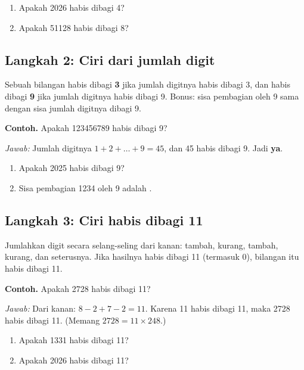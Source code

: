 \documentclass[11pt,a4paper]{article}
\begin{document}
\begin{giliranmu}
\begin{enumerate}[label=\alph*.]
    \item Apakah 2026 habis dibagi 4? \kosong
    \item Apakah 51128 habis dibagi 8? \kosong
\end{enumerate}
\end{giliranmu}

\subsection*{Langkah 2: Ciri dari jumlah digit}
Sebuah bilangan habis dibagi \textbf{3} jika jumlah digitnya habis dibagi 3, dan habis dibagi
\textbf{9} jika jumlah digitnya habis dibagi 9. Bonus: sisa pembagian oleh 9 sama dengan sisa
jumlah digitnya dibagi 9.

\begin{contoh}
\textbf{Contoh.} Apakah 123456789 habis dibagi 9?

\textit{Jawab:} Jumlah digitnya $1 + 2 + \dots + 9 = 45$, dan 45 habis dibagi 9. Jadi \textbf{ya}.
\end{contoh}

\begin{giliranmu}
\begin{enumerate}[label=\alph*.]
    \item Apakah 2025 habis dibagi 9? \kosong
    \item Sisa pembagian 1234 oleh 9 adalah \kosong.
\end{enumerate}
\end{giliranmu}

\subsection*{Langkah 3: Ciri habis dibagi 11}
Jumlahkan digit secara selang-seling dari kanan: tambah, kurang, tambah, kurang, dan seterusnya.
Jika hasilnya habis dibagi 11 (termasuk 0), bilangan itu habis dibagi 11.

\begin{contoh}
\textbf{Contoh.} Apakah 2728 habis dibagi 11?

\textit{Jawab:} Dari kanan: $8 - 2 + 7 - 2 = 11$. Karena 11 habis dibagi 11, maka 2728 habis
dibagi 11. (Memang $2728 = 11 \times 248$.)
\end{contoh}

\begin{giliranmu}
\begin{enumerate}[label=\alph*.]
    \item Apakah 1331 habis dibagi 11? \kosong
    \item Apakah 2026 habis dibagi 11? \kosong
\end{enumerate}
\end{giliranmu}
\end{document}
